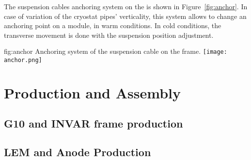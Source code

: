 The suspension cables anchoring system on the  is shown in Figure~\ref{fig:anchor}. 
In case of variation of the cryostat pipes' verticality, this system allows to change an anchoring point on a module, in warm conditions. In cold conditions, the transverse movement is done with the suspension \fdth position adjustment.
\begin{dunefigure}{fig:anchor}
{Anchoring system of the suspension cable on the  frame.}
\texttt{[image: anchor.png]}
\end{dunefigure}


\section{Production and Assembly}
\label{sec:fddp-crp-prod-assy}

\subsection{G10 and INVAR frame production}
\label{sec:fddp-crp-frame}

\subsection{LEM and Anode Production}
\label{sec:fddp-crp-LASprod}

